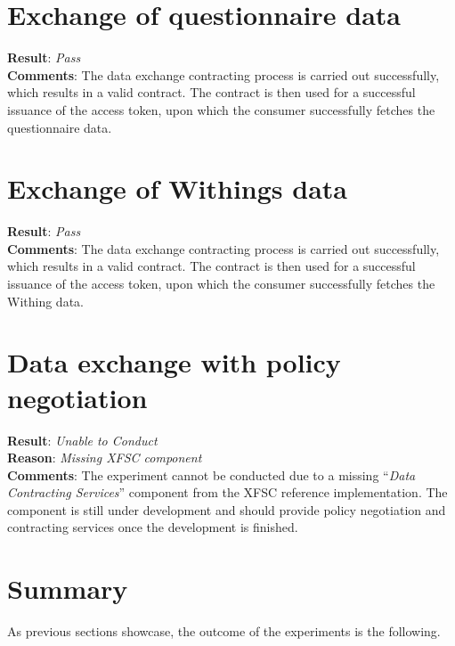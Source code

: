 \section{Exchange of questionnaire data}\label{sec:exchange-of-questionnaire-data}

\textbf{Result}: \textit{Pass}
\\
\textbf{Comments}: The data exchange contracting process is carried out successfully, which results in a valid contract.
The contract is then used for a successful issuance of the access token, upon which the consumer successfully fetches the questionnaire data.

\section{Exchange of Withings data}\label{sec:exchange-of-withings-data}

\textbf{Result}: \textit{Pass}
\\
\textbf{Comments}: The data exchange contracting process is carried out successfully, which results in a valid contract.
The contract is then used for a successful issuance of the access token, upon which the consumer successfully fetches the Withing data.

\section{Data exchange with policy negotiation}\label{sec:data-exchange-with-policy-negotiation}

\textbf{Result}: \textit{Unable to Conduct}
\\
\textbf{Reason}: \textit{Missing XFSC component}
\\
\textbf{Comments}: The experiment cannot be conducted due to a missing ``\textit{Data Contracting Services}'' component from the XFSC reference implementation.
The component is still under development and should provide policy negotiation and contracting services once the development is finished.

\section{Summary}\label{sec:summary}

As previous sections showcase, the outcome of the experiments is the following.

